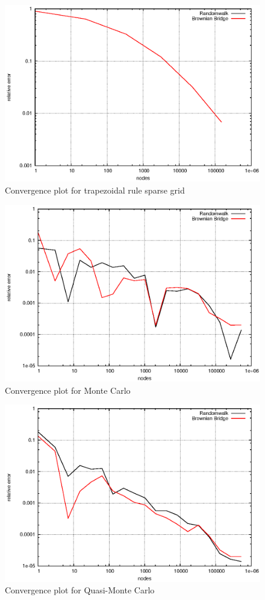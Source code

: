 \documentclass[]{article}
\begin{document}
\begin{figure}[!ht]
\centering
\includegraphics{task16_trapsparse}
\caption{Convergence plot for trapezoidal rule sparse grid }
\label{fig:Task16d}
\end{figure}

\begin{figure}[!ht]
\centering
\includegraphics{task16_mc}
\caption{Convergence plot for Monte Carlo}
\label{fig:Task16e}
\end{figure}

\begin{figure}[!ht]
\centering
\includegraphics{task16_qmc}
\caption{Convergence plot for Quasi-Monte Carlo}
\label{fig:Task16f}
\end{figure}
\end{document}
